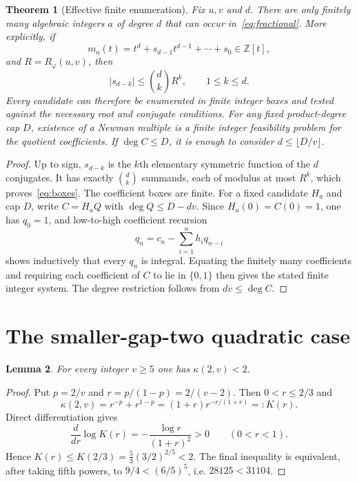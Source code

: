 \documentclass[11pt]{article}
\newtheorem{theorem}{Theorem}[section]
\newtheorem{lemma}[theorem]{Lemma}
\theoremstyle{remark}
\newcommand{\Z}{\mathbb Z}
\newcommand{\ph}{\varphi}
\numberwithin{equation}{section}
\begin{document}
\begin{theorem}[Effective finite enumeration]\label{thm:finite}
Fix $u,v$ and $d$.  There are only finitely many algebraic integers $a$ of
degree $d$ that can occur in~\eqref{eq:fractional}.  More explicitly, if
\[
 m_a(t)=t^d+s_{d-1}t^{d-1}+\cdots+s_0\in\Z[t],
\]
and $R=R_\ph(u,v)$, then
\begin{equation}\label{eq:boxes}
 |s_{d-k}|\le {d\choose k}R^k,\qquad 1\le k\le d.
\end{equation}
Every candidate can therefore be enumerated in finite integer boxes and
tested against the necessary root and conjugate conditions.  For any fixed
product-degree cap $D$, existence of a Newman multiple is a finite integer
feasibility problem for the quotient coefficients.  If $\deg C\le D$, it is
enough to consider $d\le\lfloor D/v\rfloor$.
\end{theorem}
\begin{proof}
Up to sign, $s_{d-k}$ is the $k$th elementary symmetric function of the $d$
conjugates.  It has exactly ${d\choose k}$ summands, each of modulus at most
$R^k$, which proves~\eqref{eq:boxes}.  The coefficient boxes are finite.  For
a fixed candidate $H_a$ and cap $D$, write $C=H_aQ$ with
$\deg Q\le D-dv$.  Since $H_a(0)=C(0)=1$, one has $q_0=1$, and low-to-high
coefficient recursion
\[
 q_n=c_n-\sum_{i=1}^n h_iq_{n-i}
\]
shows inductively that every $q_n$ is integral.  Equating the finitely many
coefficients and requiring each coefficient of $C$ to lie in $\{0,1\}$ then
gives the stated finite integer system.
The degree restriction follows from $dv\le\deg C$.
\end{proof}

\section{The smaller-gap-two quadratic case}

\begin{lemma}\label{lem:kappatwo}
For every integer $v\ge5$ one has $\kappa(2,v)<2$.
\end{lemma}
\begin{proof}
Put $p=2/v$ and $r=p/(1-p)=2/(v-2)$.  Then $0<r\le2/3$ and
\[
 \kappa(2,v)=r^{-p}+r^{1-p}=(1+r)r^{-r/(1+r)}=:K(r).
\]
Direct differentiation gives
\[
 \frac{d}{dr}\log K(r)=-\frac{\log r}{(1+r)^2}>0
 \qquad(0<r<1).
\]
Hence $K(r)\le K(2/3)=\frac53(3/2)^{2/5}<2$.  The final inequality is
equivalent, after taking fifth powers, to
$9/4<(6/5)^5$, i.e. $28125<31104$.
\end{proof}
\end{document}
